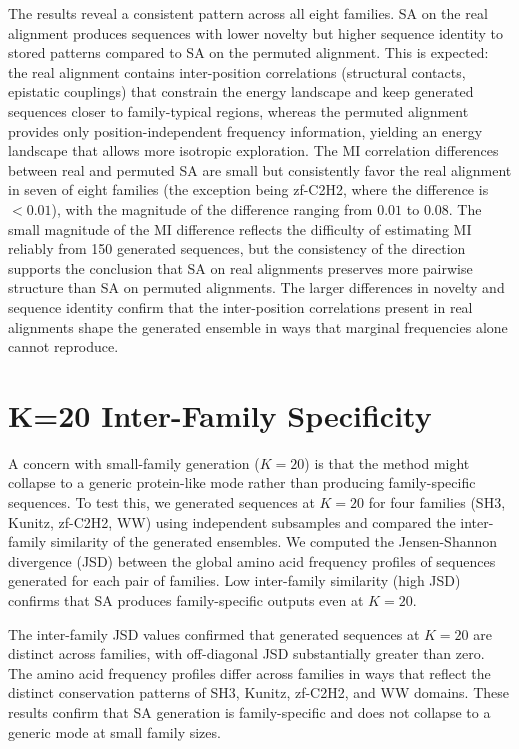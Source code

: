 The results reveal a consistent pattern across all eight families. SA on the real alignment produces sequences with lower novelty but higher sequence identity to stored patterns compared to SA on the permuted alignment. This is expected: the real alignment contains inter-position correlations (structural contacts, epistatic couplings) that constrain the energy landscape and keep generated sequences closer to family-typical regions, whereas the permuted alignment provides only position-independent frequency information, yielding an energy landscape that allows more isotropic exploration. The MI correlation differences between real and permuted SA are small but consistently favor the real alignment in seven of eight families (the exception being zf-C2H2, where the difference is $<0.01$), with the magnitude of the difference ranging from $0.01$ to $0.08$. The small magnitude of the MI difference reflects the difficulty of estimating MI reliably from 150 generated sequences, but the consistency of the direction supports the conclusion that SA on real alignments preserves more pairwise structure than SA on permuted alignments. The larger differences in novelty and sequence identity confirm that the inter-position correlations present in real alignments shape the generated ensemble in ways that marginal frequencies alone cannot reproduce.

\section{K=20 Inter-Family Specificity}\label{si:k20-specificity}

A concern with small-family generation ($K{=}20$) is that the method might collapse to a generic protein-like mode rather than producing family-specific sequences. To test this, we generated sequences at $K{=}20$ for four families (SH3, Kunitz, zf-C2H2, WW) using independent subsamples and compared the inter-family similarity of the generated ensembles. We computed the Jensen-Shannon divergence (JSD) between the global amino acid frequency profiles of sequences generated for each pair of families. Low inter-family similarity (high JSD) confirms that SA produces family-specific outputs even at $K{=}20$.

The inter-family JSD values confirmed that generated sequences at $K{=}20$ are distinct across families, with off-diagonal JSD substantially greater than zero. The amino acid frequency profiles differ across families in ways that reflect the distinct conservation patterns of SH3, Kunitz, zf-C2H2, and WW domains. These results confirm that SA generation is family-specific and does not collapse to a generic mode at small family sizes.
